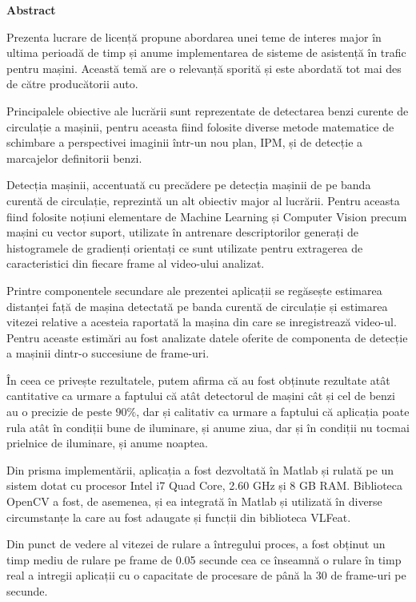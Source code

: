 \thispagestyle{plain}

\begin{center}
	\Large \textbf{Abstract}	
\end{center}

Prezenta lucrare de licență propune abordarea unei teme de interes major în ultima perioadă de timp și anume implementarea de sisteme de asistență în trafic pentru mașini. Această temă are o relevanță sporită și este abordată tot mai des de către producătorii auto. 

Principalele obiective ale lucrării sunt reprezentate de detectarea benzi curente de circulație a mașinii, pentru aceasta fiind folosite diverse metode matematice de schimbare a perspectivei imaginii într-un nou plan, IPM, și de detecție a marcajelor definitorii benzi.

Detecția mașinii, accentuată cu precădere pe detecția mașinii de pe banda curentă de circulație, reprezintă un alt obiectiv major al lucrării. Pentru aceasta fiind folosite noțiuni elementare de Machine Learning și Computer Vision precum mașini cu vector suport, utilizate în antrenare descriptorilor generați de histogramele de gradienți orientați ce sunt utilizate pentru extragerea de caracteristici din fiecare frame al video-ului analizat.

Printre componentele secundare ale prezentei aplicații se regăsește estimarea distanței față de mașina detectată pe banda curentă de circulație și estimarea vitezei relative a acesteia raportată la mașina din care se inregistrează video-ul. 
Pentru aceaste estimări au fost analizate datele oferite de componenta de detecție a mașinii dintr-o succesiune de frame-uri.

În ceea ce privește rezultatele, putem afirma că au fost obținute rezultate atât cantitative ca urmare a faptului că atât detectorul de mașini cât și cel de benzi au o precizie de peste $90\%$, dar și calitativ ca urmare a faptului că aplicația poate rula atât în condiții bune de iluminare, și anume ziua, dar și în condiții nu tocmai prielnice de iluminare, și anume noaptea.

Din prisma implementării, aplicația a fost dezvoltată în Matlab și rulată pe un sistem dotat cu procesor Intel i7 Quad Core, 2.60 GHz și 8 GB RAM. Biblioteca OpenCV a fost, de asemenea, și ea integrată în Matlab și utilizată în diverse circumstanțe la care au fost adaugate și funcții din biblioteca VLFeat.

Din punct de vedere al vitezei de rulare a întregului proces, a fost obținut un timp mediu de rulare pe frame de 0.05 secunde cea ce înseamnă o rulare în timp real a intregii aplicații cu o capacitate de procesare de până la 30 de frame-uri pe secunde.  
\vspace*{\fill}